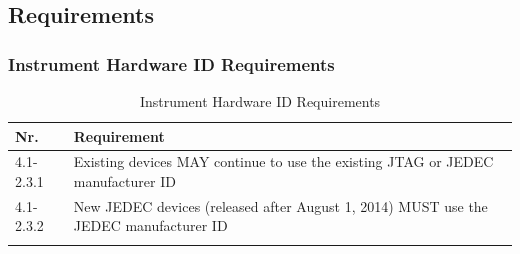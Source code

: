 \newcommand*{\tabletype}{longtable}

\subsection[KIS Requirements]{Requirements }\label{app:anhang_kis_requirements}
\subsubsection{Instrument Hardware ID Requirements}
\begin{\tabletype}[H]{|p{.12\linewidth}|p{.83\linewidth}|}
    \hline
    \textbf{Nr.} & \textbf{Requirement} \\ \hline
    \endhead
    4.1-2.3.1 & Existing  devices MAY continue to use the existing JTAG or JEDEC
    manufacturer ID \\ \hline
    4.1-2.3.2 & New  JEDEC devices (released after August 1, 2014) MUST use the  JEDEC
    manufacturer ID \\ \hline
    \caption {Instrument Hardware ID Requirements}
    \label{tab:InstrumentHardwareIDRequirementsList}
\end{\tabletype}
